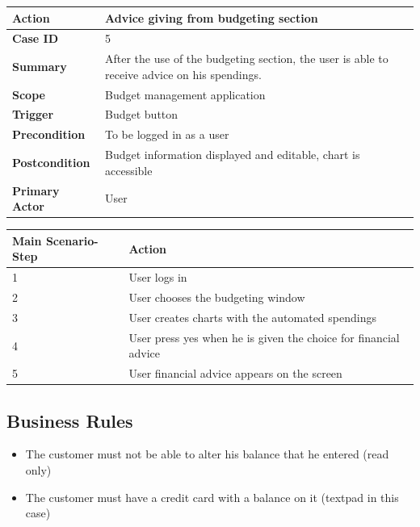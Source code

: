 \documentclass[letterpaper]{article}
\begin{document}
		\begin{center}
			\begin{tabular}{ | m{3.5cm} | m{7.5cm}| } 
				\hline
				\textbf{Action} & Advice giving from budgeting section \\ 
				\hline
				\textbf{Case ID} & 5 \\ 
				\hline
				\textbf{Summary} & After the use of the budgeting section, the user is able to receive advice on his spendings. \\
				\hline
				\textbf{Scope} & Budget management application \\ 
				\hline
				\textbf{Trigger} & Budget button \\
				\hline
				\textbf{Precondition} & To be logged in as a user \\ 
				\hline
				\textbf{Postcondition} & Budget information displayed and editable, chart is accessible \\ 
				\hline
				\textbf{Primary Actor} & User \\ 
				\hline
			\end{tabular}
		
			\vspace{2mm}
		
			\begin{tabular}{ | m{3.5cm} | m{7.5cm}| } 
				\hline
				\textbf{Main Scenario-Step} & \textbf{Action} \\ 
				\hline
				1 & User logs in \\ 
				\hline
				2 & User chooses the budgeting window \\ 
				\hline
				3 & User creates charts with the automated spendings \\ 
				\hline
				4 & User press yes when he is given the choice for financial advice\\ 
				\hline
				5 & User financial advice appears on the screen\\ 
				\hline
			\end{tabular}
		\end{center}
	
	\subsection{Business Rules}
	
		\begin{itemize}
			
			\item The customer must not be able to alter his balance that he entered (read only)
			
			\item The customer must have a credit card with a balance on it (textpad in this case)
			
		\end{itemize}
\end{document}

